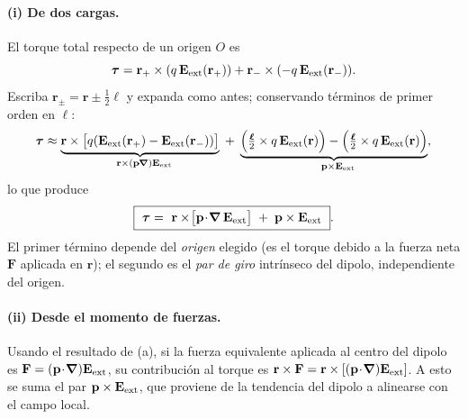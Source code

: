 \documentclass{article}
\begin{document}
\paragraph{(i) De dos cargas.} El torque total respecto de un origen $O$ es
\[
\boldsymbol{\tau}
=\mathbf r_{+}\times(q\,\mathbf E_{\rm ext}(\mathbf r_{+}))
+\mathbf r_{-}\times(-q\,\mathbf E_{\rm ext}(\mathbf r_{-})).
\]
Escriba $\mathbf r_{\pm}=\mathbf r\pm \tfrac{1}{2}\boldsymbol{\ell}$ y expanda como antes; conservando términos de primer orden en $\boldsymbol{\ell}$:
\[
\boldsymbol{\tau}
\approx \underbrace{\mathbf r\times\big[q(\mathbf E_{\rm ext}(\mathbf r_{+})-\mathbf E_{\rm ext}(\mathbf r_{-}))\big]}_{\ \ \mathbf r\times(\mathbf p\!\cdot\!\boldsymbol{\nabla})\mathbf E_{\rm ext}}
\;+\;
\underbrace{\Big(\tfrac{\boldsymbol{\ell}}{2}\times q\,\mathbf E_{\rm ext}(\mathbf r)\Big)
-\Big(\tfrac{\boldsymbol{\ell}}{2}\times q\,\mathbf E_{\rm ext}(\mathbf r)\Big)}_{\ \ \mathbf p\times\mathbf E_{\rm ext}},
\]
lo que produce
\[
\boxed{\ \boldsymbol{\tau}
=\ \mathbf r\times\!\big[\mathbf p\!\cdot\!\boldsymbol{\nabla}\,\mathbf E_{\rm ext}\big]
\;+\; \mathbf p\times\mathbf E_{\rm ext}\ }.
\]
El primer término depende del \emph{origen} elegido (es el torque debido a la fuerza neta $\mathbf F$ aplicada en $\mathbf r$); el segundo es el \emph{par de giro} intrínseco del dipolo, independiente del origen.

\paragraph{(ii) Desde el momento de fuerzas.} Usando el resultado de (a), si la fuerza equivalente aplicada al centro del dipolo es $\mathbf F=(\mathbf p\!\cdot\!\boldsymbol{\nabla})\mathbf E_{\rm ext}$, su contribución al torque es $\mathbf r\times\mathbf F=\mathbf r\times[(\mathbf p\!\cdot\!\boldsymbol{\nabla})\mathbf E_{\rm ext}]$. A esto se suma el par $\mathbf p\times\mathbf E_{\rm ext}$, que proviene de la tendencia del dipolo a alinearse con el campo local.

\end{document}
